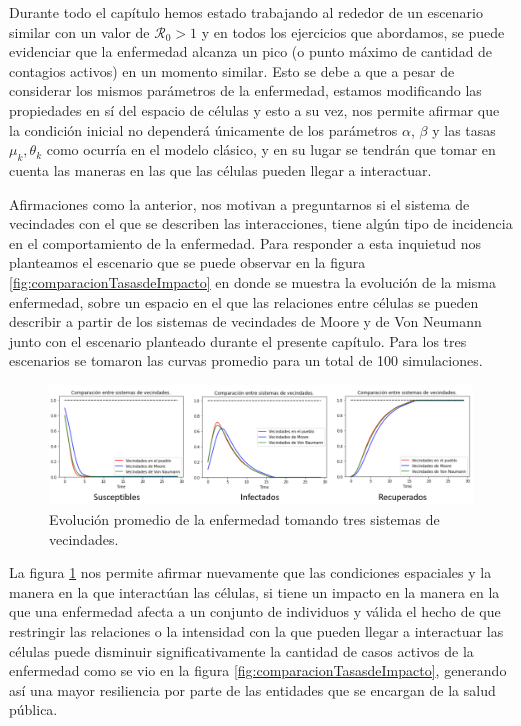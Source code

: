 Durante todo el capítulo hemos estado trabajando al rededor de un escenario similar con un valor de $\mathcal{R}_0>1$ y en todos los ejercicios que abordamos, se puede evidenciar que la enfermedad alcanza un pico (o punto máximo de cantidad de contagios activos) en un momento similar. Esto se debe a que a pesar de considerar los mismos parámetros de la enfermedad, estamos modificando las propiedades en sí del espacio de células y esto a su vez, nos permite afirmar que la condición inicial no dependerá únicamente de los parámetros $\alpha$, $\beta$ y las tasas $\mu_k, \theta_k$ como ocurría en el modelo clásico, y en su lugar se tendrán que tomar en cuenta las maneras en las que las células pueden llegar a interactuar.

Afirmaciones como la anterior, nos motivan a preguntarnos si el sistema de vecindades con el que se describen las interacciones, tiene algún tipo de incidencia en el comportamiento de la enfermedad. Para responder a esta inquietud nos planteamos el escenario que se puede observar en la figura \ref{fig:comparacionTasasdeImpacto} en donde se muestra la evolución de la misma enfermedad, sobre un espacio en el que las relaciones entre células se pueden describir a partir de los sistemas de vecindades de Moore y de Von Neumann junto con el escenario planteado durante el presente capítulo. Para los tres escenarios se tomaron las curvas promedio para un total de 100 simulaciones.

\newpage

\begin{figure}[h]
  \centering
    \includegraphics[width=1\textwidth]{Imagenes/comparacionSistemasVecindades.PNG}
    \caption{Evolución promedio de la enfermedad tomando tres sistemas de vecindades.}
    \label{fig:comparacionSistemasDeVecindades}
\end{figure}

La figura \ref{fig:comparacionSistemasDeVecindades} nos permite afirmar nuevamente que las condiciones espaciales y la manera en la que interactúan las células, si tiene un impacto en la manera en la que una enfermedad afecta a un conjunto de individuos y válida el hecho de que restringir las relaciones o la intensidad con la que pueden llegar a interactuar las células puede disminuir significativamente la cantidad de casos activos de la enfermedad como se vio en la figura \ref{fig:comparacionTasasdeImpacto}, generando así una mayor resiliencia por parte de las entidades que se encargan de la salud pública.